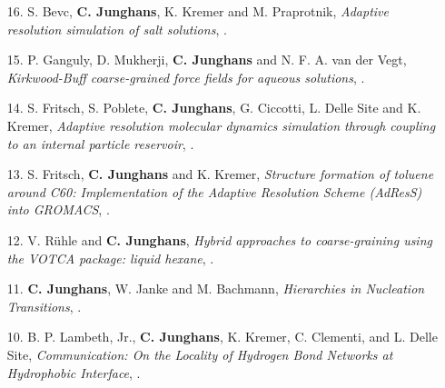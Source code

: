 \documentclass{article}
\begin{document}
\begin{enumerate}
\item[16.] S. Bevc, \textbf{C. Junghans}, K. Kremer and M. Praprotnik,
  \textit{Adaptive resolution simulation of salt solutions},
  .

\item[15.] P. Ganguly, D. Mukherji, \textbf{C. Junghans} and N. F. A. van der Vegt,
  \textit{Kirkwood-Buff coarse-grained force fields for aqueous solutions},
  .

\item[14.] S. Fritsch, S. Poblete, \textbf{C. Junghans}, G. Ciccotti, L. Delle Site and K. Kremer,
  \textit{Adaptive resolution molecular dynamics simulation through coupling to an internal particle reservoir},
  .

\item[13.] S. Fritsch, \textbf{C. Junghans} and K. Kremer,
  \textit{Structure formation of toluene around C60: Implementation of the Adaptive Resolution Scheme (AdResS) into GROMACS},
  .

\item[12.] V. R{\"u}hle and \textbf{C. Junghans},
  \textit{Hybrid approaches to coarse-graining using the VOTCA package: liquid hexane},
  .

\item[11.] \textbf{C. Junghans}, W. Janke and M. Bachmann,
  \textit{Hierarchies in Nucleation Transitions},
  .

\item[10.] B. P. Lambeth, Jr., \textbf{C. Junghans}, K. Kremer, C. Clementi, and L. Delle Site, 
  \textit{Communication: On the Locality of Hydrogen Bond Networks at Hydrophobic Interface},
  .


\end{enumerate}
\end{document}
